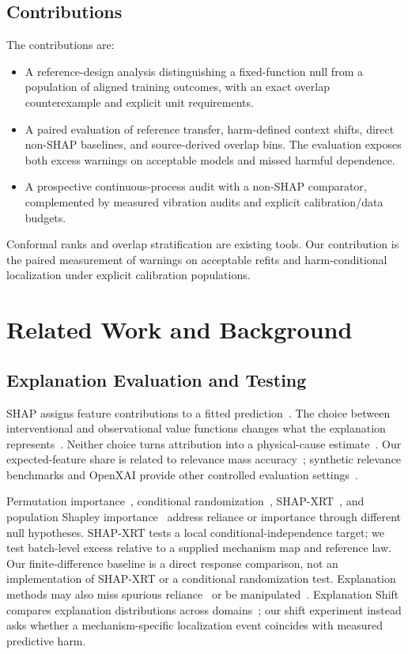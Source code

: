 \documentclass[conference]{IEEEtran}
\begin{document}
\subsection{Contributions}
The contributions are:
\begin{itemize}
\item A reference-design analysis distinguishing a fixed-function null from a population of aligned training outcomes, with an exact overlap counterexample and explicit unit requirements.
\item A paired evaluation of reference transfer, harm-defined context shifts, direct non-SHAP baselines, and source-derived overlap bins. The evaluation exposes both excess warnings on acceptable models and missed harmful dependence.
\item A prospective continuous-process audit with a non-SHAP comparator, complemented by measured vibration audits and explicit calibration/data budgets.
\end{itemize}
Conformal ranks and overlap stratification are existing tools. Our contribution is the paired measurement of warnings on acceptable refits and harm-conditional localization under explicit calibration populations.

\section{Related Work and Background}
\label{sec:background}
\subsection{Explanation Evaluation and Testing}
SHAP assigns feature contributions to a fitted prediction~\cite{lundberg2017shap}. The choice between interventional and observational value functions changes what the explanation represents~\cite{chen2020true,sundararajan2020many,janzing2020feature}. Neither choice turns attribution into a physical-cause estimate~\cite{kumar2020problems}. Our expected-feature share is related to relevance mass accuracy~\cite{arras2022clevr}; synthetic relevance benchmarks and OpenXAI provide other controlled evaluation settings~\cite{liu2021synthetic,agarwal2022openxai}.

Permutation importance~\cite{altmann2010permutation}, conditional randomization~\cite{candes2018panning}, SHAP-XRT~\cite{teneggi2023shapxrt}, and population Shapley importance~\cite{williamson2020shapley} address reliance or importance through different null hypotheses. SHAP-XRT tests a local conditional-independence target; we test batch-level excess relative to a supplied mechanism map and reference law. Our finite-difference baseline is a direct response comparison, not an implementation of SHAP-XRT or a conditional randomization test. Explanation methods may also miss spurious reliance~\cite{adebayo2022spurious} or be manipulated~\cite{slack2020fooling}. Explanation Shift compares explanation distributions across domains~\cite{mougan2025shift}; our shift experiment instead asks whether a mechanism-specific localization event coincides with measured predictive harm.
\end{document}
